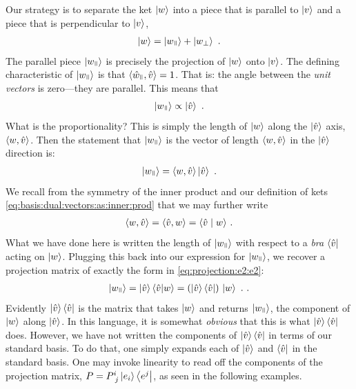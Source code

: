 \documentclass[12pt, oneside]{report}    %
\begin{document}
Our strategy is to separate the ket $\left|w\right\rangle$ into a piece that is parallel to $\left|v\right\rangle$ and a piece that is perpendicular to $\left|v\right\rangle$,
\begin{align}
    \ket{w}= \ket{w_\paral} + \ket{w_\perp} \ .
\end{align}
The parallel piece $\ket{w_\paral}$ is precisely the projection of $\left|w\right\rangle$ onto $\left|v\right\rangle$.  The defining characteristic of $\ket{w_\paral}$ is that $\la \hat{w}_\paral, \hat{v}\ra = 1$. That is: the angle between the \emph{unit vectors} is zero---they are parallel. This means that 
\begin{align}
    \ket{w_\paral} \propto \ket{\hat{v}} \ .
\end{align}
What is the proportionality? This is simply the length of $\left|w\right\rangle$ along the $\left|\hat{v}\right\rangle$ axis, $\langle w, \hat v \rangle$. Then the statement that $\ket{w_\paral}$ is the vector of length $\langle w, \hat v \rangle$ in the $\left|\hat v\right\rangle$ direction is:
\begin{align}
    \ket{w_\paral} = \la w, \hat{v} \ra \ket{\hat{v}} 
    \ .
\end{align}
We recall from the symmetry of the inner product and our definition of kets \eqref{eq:basis:dual:vectors:as:inner:prod} that we may further write
\begin{align}
    \langle w, \hat{v} \rangle = \langle \hat{v}, w \rangle = \langle \hat{v} \mid w \rangle \ .
\end{align}
What we have done here is written the length of $\ket{w_\paral}$ with respect to a \emph{bra} $\left\langle\hat{v}\right|$ acting on $\left|w\right\rangle$. Plugging this back into our expression for $\ket{w_\paral}$, we recover a projection matrix of exactly the form in \eqref{eq:projection:e2:e2}:
\begin{align}
    \ket{w_\paral} = \ket{\hat{v}} \la{\hat{v}} | w \ra  =
    \left(\ket{\hat{v}} \bra{\hat{v}} \right)  \, \ket{w} \ .
     \ .
\end{align}
Evidently $\left|\hat{v}\right\rangle \left\langle\hat{v}\right|$ is the matrix that takes $\left|w\right\rangle$ and returns $\ket{w_\paral}$, the component of $\left|w\right\rangle$ along $\left|\hat{v}\right\rangle$. In this language, it is somewhat \emph{obvious} that this is what $\left|\hat{v}\right\rangle \left\langle\hat{v}\right|$ does. However, we have not written the components of $\left|\hat{v}\right\rangle \left\langle\hat{v}\right|$ in terms of our standard basis. To do that, one simply expands each  of $\left|\hat{v}\right\rangle$ and $\left\langle\hat{v}\right|$ in the standard basis. One may invoke linearity to read off the components of the projection matrix, $P = P\aij{i}{j}\ket{e_i}\bra{e^j}$, as seen in the following examples. 
\end{document}
